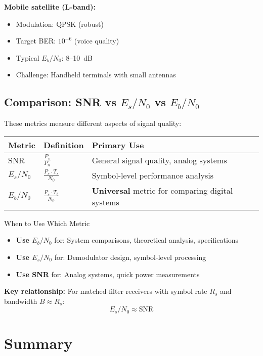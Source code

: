 \textbf{Mobile satellite (L-band):}
\begin{itemize}
\item Modulation: QPSK (robust)
\item Target BER: $10^{-6}$ (voice quality)
\item Typical $E_b/N_0$: 8--10~dB
\item Challenge: Handheld terminals with small antennas
\end{itemize}

\subsection{Comparison: SNR vs $E_s/N_0$ vs $E_b/N_0$}

These metrics measure different aspects of signal quality:

\begin{center}
\begin{tabular}{@{}llp{5cm}@{}}
\toprule
Metric & Definition & Primary Use \\
\midrule
SNR & $\frac{P_s}{P_n}$ & General signal quality, analog systems \\[8pt]
$E_s/N_0$ & $\frac{P_s \cdot T_s}{N_0}$ & Symbol-level performance analysis \\[8pt]
$E_b/N_0$ & $\frac{P_s \cdot T_b}{N_0}$ & \textbf{Universal} metric for comparing digital systems \\
\bottomrule
\end{tabular}
\end{center}

\begin{calloutbox}{When to Use Which Metric}
\begin{itemize}
\item \textbf{Use $E_b/N_0$} for: System comparisons, theoretical analysis, specifications
\item \textbf{Use $E_s/N_0$} for: Demodulator design, symbol-level processing
\item \textbf{Use SNR} for: Analog systems, quick power measurements
\end{itemize}

\textbf{Key relationship:} For matched-filter receivers with symbol rate $R_s$ and bandwidth $B \approx R_s$:
\[
E_s/N_0 \approx \mathrm{SNR}
\]
\end{calloutbox}

\section{Summary}

